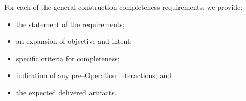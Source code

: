 For each of the general construction completeness requirements, we provide:

\begin{itemize}
	\item the statement of the requirements;
	\item an expansion of objective and intent;
	\item specific criteria for completeness;
	\item indication of any pre--Operation interactions; and
	\item the expected delivered artifacts.
\end{itemize}

